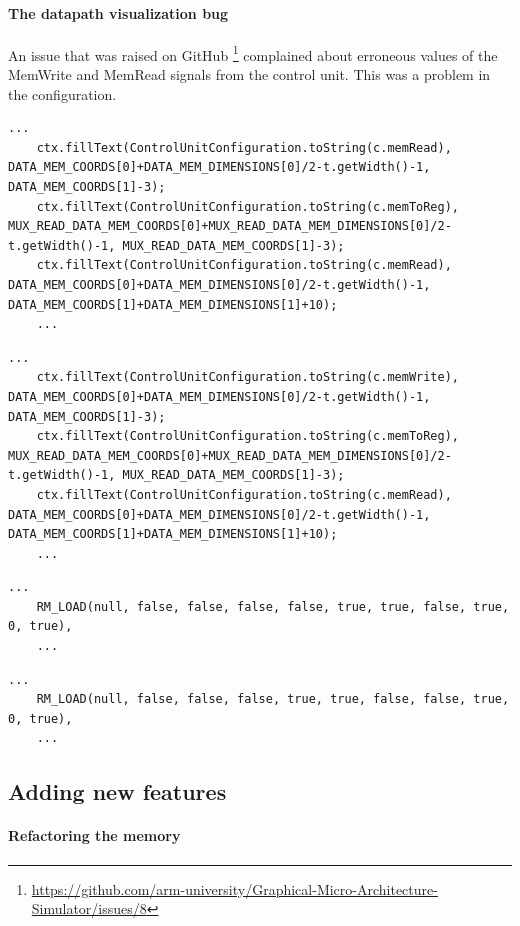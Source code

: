 \paragraph*{The datapath visualization bug}
An issue that was raised on GitHub \footnote{\url{https://github.com/arm-university/Graphical-Micro-Architecture-Simulator/issues/8}} complained about erroneous values of the MemWrite and MemRead signals from the control unit. This was a problem in the configuration.
\begin{lstlisting}[caption={Buggy SingleCycleVis.java}]
	...
	ctx.fillText(ControlUnitConfiguration.toString(c.memRead), DATA_MEM_COORDS[0]+DATA_MEM_DIMENSIONS[0]/2-t.getWidth()-1, DATA_MEM_COORDS[1]-3);
	ctx.fillText(ControlUnitConfiguration.toString(c.memToReg), MUX_READ_DATA_MEM_COORDS[0]+MUX_READ_DATA_MEM_DIMENSIONS[0]/2-t.getWidth()-1, MUX_READ_DATA_MEM_COORDS[1]-3);
	ctx.fillText(ControlUnitConfiguration.toString(c.memRead), DATA_MEM_COORDS[0]+DATA_MEM_DIMENSIONS[0]/2-t.getWidth()-1, DATA_MEM_COORDS[1]+DATA_MEM_DIMENSIONS[1]+10);
	...
\end{lstlisting}
\begin{lstlisting}[caption={Fixed SingleCycleVis.java}]
	...
	ctx.fillText(ControlUnitConfiguration.toString(c.memWrite), DATA_MEM_COORDS[0]+DATA_MEM_DIMENSIONS[0]/2-t.getWidth()-1, DATA_MEM_COORDS[1]-3);
	ctx.fillText(ControlUnitConfiguration.toString(c.memToReg), MUX_READ_DATA_MEM_COORDS[0]+MUX_READ_DATA_MEM_DIMENSIONS[0]/2-t.getWidth()-1, MUX_READ_DATA_MEM_COORDS[1]-3);
	ctx.fillText(ControlUnitConfiguration.toString(c.memRead), DATA_MEM_COORDS[0]+DATA_MEM_DIMENSIONS[0]/2-t.getWidth()-1, DATA_MEM_COORDS[1]+DATA_MEM_DIMENSIONS[1]+10);
	...
\end{lstlisting}
\begin{lstlisting}[caption={BuggyControlUnitConfiguration.java}]
	...
	RM_LOAD(null, false, false, false, false, true, true, false, true, 0, true),
	...
\end{lstlisting}
\begin{lstlisting}[caption={Fixed ControlUnitConfiguration.java}]
	...
	RM_LOAD(null, false, false, false, true, true, false, false, true, 0, true),
	...
\end{lstlisting}

\subsection*{Adding new features}

\paragraph{Refactoring the memory}

